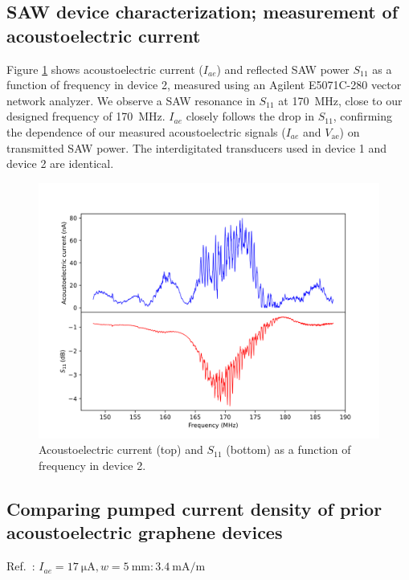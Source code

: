\documentclass{beavtex_dub_edit}
\begin{document}
\subsection{SAW device characterization; measurement of acoustoelectric current} 
Figure \ref{AECP Figure S3} shows acoustoelectric current ($I_{ae}$) and reflected SAW power $S_{11}$ as a function of frequency in device 2, measured using an Agilent E5071C-280 vector network analyzer. We observe a SAW resonance in $S_{11}$ at \SI{170}{\mega\hertz}, close to our designed frequency of \SI{170}{\mega\hertz}.  $I_{ae}$ closely follows the drop in $S_{11}$, confirming the dependence of our measured acoustoelectric signals ($I_{ae}$ and $V_{\mathrm{ae}}$) on transmitted SAW power. The interdigitated transducers used in device 1 and device 2 are identical.

\begin{figure}
    \includegraphics[width = 1\textwidth]{Figure S3, AEC vs S11.png}
    \caption{Acoustoelectric current (top) and $S_{11}$ (bottom) as a function of frequency in device 2.}
    \label{AECP Figure S3}
\end{figure}

\subsection{Comparing pumped current density of prior acoustoelectric graphene devices}

Ref.\ \cite{okuda_graphene_2018}: $I_{ae} = \SI{17}{\micro \ampere}, w = \SI{5}{\milli\meter}: \SI{3.4}{\milli \ampere/\meter}$
\end{document}
